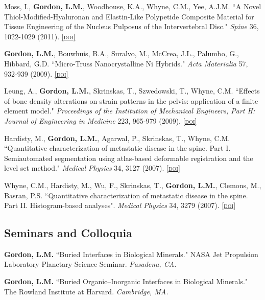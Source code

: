 Moss, I., \textbf{Gordon, L.M.}, Woodhouse, K.A., Whyne, C.M., Yee, A.J.M. ``A Novel Thiol-Modified-Hyaluronan and Elastin-Like Polypetide Composite Material for Tissue Engineering of the Nucleus Pulposus of the Intervertebral Disc." \emph{Spine} 36, 1022-1029 (2011). \href{http://dx.doi.org/10.1097/BRS.0b013e3181e7b705}{\textsc{\footnotesize{[doi]}}}

\textbf{Gordon, L.M.}, Bouwhuis, B.A., Suralvo, M., McCrea, J.L., Palumbo, G., Hibbard, G.D. ``Micro-Truss Nanocrystalline Ni Hybrids." \emph{Acta Materialia} 57, 932-939 (2009). \href{http://dx.doi.org/10.1016/j.actamat.2008.10.038}{\textsc{\footnotesize{[doi]}}}

Leung, A., \textbf{Gordon, L.M.}, Skrinskas, T., Szwedowski, T., Whyne, C.M. ``Effects of bone density alterations on strain patterns in the pelvis: application of a finite element model." \emph{Proceedings of the Institution of Mechanical Engineers, Part H: Journal of Engineering in Medicine} 223, 965-979 (2009). \href{http://dx.doi.org/10.1243/09544119JEIM618}{\textsc{\footnotesize{[doi]}}}

Hardisty, M., \textbf{Gordon, L.M.}, Agarwal, P., Skrinskas, T., Whyne, C.M. ``Quantitative characterization of metastatic disease in the spine. Part I. Semiautomated segmentation using atlas-based deformable registration and the level set method." \emph{Medical Physics} 34, 3127 (2007). \href{http://dx.doi.org/10.1118/1.2746498}{\textsc{\footnotesize{[doi]}}}

Whyne, C.M., Hardisty, M., Wu, F., Skrinskas, T., \textbf{Gordon, L.M.}, Clemons, M., Basran, P.S. ``Quantitative characterization of metastatic disease in the spine. Part II. Histogram-based analyses". \emph{Medical Physics} 34, 3279 (2007). \href{http://dx.doi.org/10.1118/1.2756939}{\textsc{\footnotesize{[doi]}}}
\endgroup

\subsection*{Seminars and Colloquia}
\textbf{Gordon, L.M.} ``Buried Interfaces in Biological Minerals." NASA Jet Propulsion Laboratory Planetary Science Seminar. \emph{Pasadena, CA.}
\begingroup\setlength{\parskip}{0.15cm}

\textbf{Gordon, L.M.} ``Buried Organic--Inorganic Interfaces in Biological Minerals." The Rowland Institute at Harvard. \emph{Cambridge, MA.}

